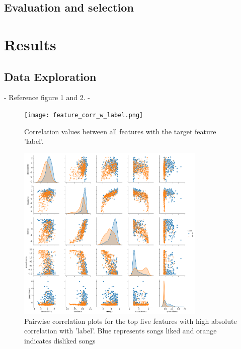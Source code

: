 \documentclass{article}
\begin{document}
    \subsection{Evaluation and selection}
    

    
    \section{Results}
    
    \subsection{Data Exploration}

    
    - Reference figure 1 and 2. 
    - 
    
     \begin{figure}
        \centering
        \texttt{[image: feature\_corr\_w\_label.png]}
        \caption{Correlation values between all features with the target feature 'label'.}
        \label{fig:my_label}
    \end{figure}
    
    
    
    
    
    \begin{figure}
        \centering
        \includegraphics[width=0.8\textwidth]{corr_plot_top_5}
        \caption{Pairwise correlation plots for the top five features with high absolute correlation with 'label'. Blue represents songs liked and orange indicates disliked songs }
        \label{fig:my_label}
    \end{figure}
    
\end{document}
